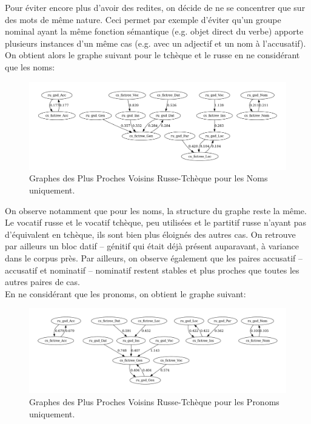 \documentclass{cours}
\begin{document}
Pour éviter encore plus d'avoir des redites, on décide de ne se concentrer que sur des mots de même nature.
Ceci permet par exemple d'éviter qu'un groupe nominal ayant la même fonction sémantique (e.g. objet direct du verbe) apporte plusieurs instances d'un même cas (e.g. avec un adjectif et un nom à l'accusatif).
On obtient alors le graphe suivant pour le tchèque et le russe en ne considérant que les noms:

\begin{figure}[H]
	\centering
	\includegraphics[width=\textwidth]{Figures/GNN/gnn_ru_gsd_cs_fictree_Nouns_Only}
	\caption{Graphes des Plus Proches Voisins Russe-Tchèque pour les Noms uniquement.}
\end{figure}

On observe notamment que pour les noms, la structure du graphe reste la même.
Le vocatif russe et le vocatif tchèque, peu utilisées et le partitif russe n'ayant pas d'équivalent en tchèque, ils sont bien plus éloignés des autres cas.
On retrouve par ailleurs un bloc datif -- génitif qui était déjà présent auparavant, à variance dans le corpus près.
Par ailleurs, on observe également que les paires accusatif -- accusatif et nominatif -- nominatif restent stables et plus proches que toutes les autres paires de cas.\\
En ne considérant que les pronoms, on obtient le graphe suivant:

\begin{figure}[H]
	\centering
	\includegraphics[width=\textwidth]{Figures/GNN/gnn_ru_gsd_cs_fictree_Pronouns_Only}
	\caption{Graphes des Plus Proches Voisins Russe-Tchèque pour les Pronoms uniquement.}
\end{figure}
\end{document}
